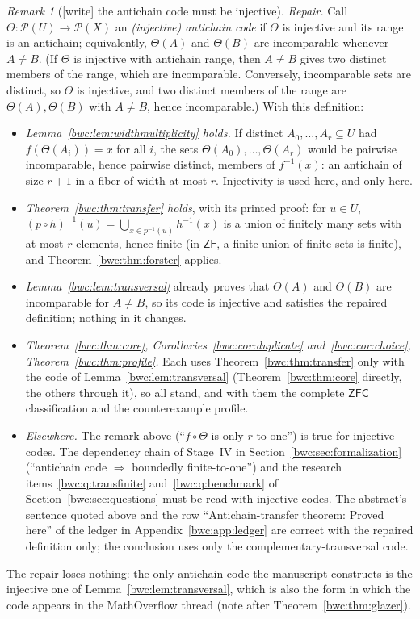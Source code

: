 \documentclass[11pt,letterpaper]{article}
\numberwithin{equation}{section}
\theoremstyle{plain}
\theoremstyle{definition}
\theoremstyle{remark}
\newtheorem{remark}[remark]{Remark}
\newcommand{\Pow}{\mathcal P}
\newcommand{\ZF}{\mathsf{ZF}}
\newcommand{\ZFC}{\mathsf{ZFC}}
\begin{document}
\begin{remark}[{[write]} the antichain code must be injective]
\emph{Repair.} Call $\Theta:\Pow(U)\to\Pow(X)$ an \emph{(injective) antichain
code} if $\Theta$ is injective and its range is an antichain; equivalently,
$\Theta(A)$ and $\Theta(B)$ are incomparable whenever $A\neq B$. (If $\Theta$
is injective with antichain range, then $A\neq B$ gives two distinct members
of the range, which are incomparable. Conversely, incomparable sets are
distinct, so $\Theta$ is injective, and two distinct members of the range
are $\Theta(A),\Theta(B)$ with $A\neq B$, hence incomparable.) With this
definition:
\begin{itemize}
\item \emph{Lemma~\ref{bwc:lem:widthmultiplicity} holds.} If distinct
 $A_0,\dots,A_r\subseteq U$ had $f(\Theta(A_i))=x$ for all $i$, the sets
 $\Theta(A_0),\dots,\Theta(A_r)$ would be pairwise incomparable, hence
 pairwise distinct, members of $f^{-1}(x)$: an antichain of size $r+1$ in a
 fiber of width at most $r$. Injectivity is used here, and only here.
\item \emph{Theorem~\ref{bwc:thm:transfer} holds}, with its printed proof:
 for $u\in U$, $(p\circ h)^{-1}(u)=\bigcup_{x\in p^{-1}(u)}h^{-1}(x)$ is a
 union of finitely many sets with at most $r$ elements, hence finite (in
 $\ZF$, a finite union of finite sets is finite), and
 Theorem~\ref{bwc:thm:forster} applies.
\item \emph{Lemma~\ref{bwc:lem:transversal}} already proves that $\Theta(A)$
 and $\Theta(B)$ are incomparable for $A\neq B$, so its code is injective and
 satisfies the repaired definition; nothing in it changes.
\item \emph{Theorem~\ref{bwc:thm:core}, Corollaries~\ref{bwc:cor:duplicate}
 and~\ref{bwc:cor:choice}, Theorem~\ref{bwc:thm:profile}.} Each uses
 Theorem~\ref{bwc:thm:transfer} only with the code of
 Lemma~\ref{bwc:lem:transversal} (Theorem~\ref{bwc:thm:core} directly, the
 others through it), so all stand, and with them the complete $\ZFC$
 classification and the counterexample profile.
\item \emph{Elsewhere.} The remark above (``$f\circ\Theta$ is only
 $r$-to-one'') is true for injective codes. The dependency chain of Stage~IV
 in Section~\ref{bwc:sec:formalization} (``antichain code $\Rightarrow$
 boundedly finite-to-one'') and the research
 items~\ref{bwc:q:transfinite} and~\ref{bwc:q:benchmark} of
 Section~\ref{bwc:sec:questions} must be read with injective codes. The
 abstract's sentence quoted above and the row ``Antichain-transfer theorem:
 Proved here'' of the ledger in Appendix~\ref{bwc:app:ledger} are correct with
 the repaired definition only; the conclusion uses only the
 complementary-transversal code.
\end{itemize}
The repair loses nothing: the only antichain code the manuscript constructs
is the injective one of Lemma~\ref{bwc:lem:transversal}, which is also the
form in which the code appears in the MathOverflow thread (note after
Theorem~\ref{bwc:thm:glazer}).
\end{remark}
\end{document}
